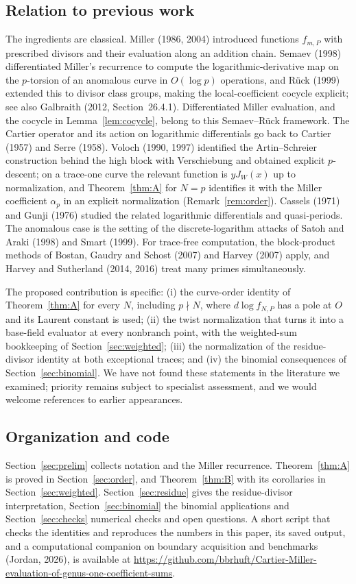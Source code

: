 \documentclass[11pt,a4paper]{article}
\numberwithin{equation}{section}
\theoremstyle{plain}
\theoremstyle{definition}
\begin{document}
\subsection{Relation to previous work}
The ingredients are classical. Miller (1986, 2004) introduced functions $f_{m,P}$ with prescribed divisors and their evaluation along an addition chain. Semaev (1998) differentiated Miller's recurrence to compute the logarithmic-derivative map on the $p$-torsion of an anomalous curve in $O(\log p)$ operations, and R\"uck (1999) extended this to divisor class groups, making the local-coefficient cocycle explicit; see also Galbraith (2012, Section~26.4.1). Differentiated Miller evaluation, and the cocycle in Lemma~\ref{lem:cocycle}, belong to this Semaev--R\"uck framework. The Cartier operator and its action on logarithmic differentials go back to Cartier (1957) and Serre (1958). Voloch (1990, 1997) identified the Artin--Schreier construction behind the high block with Verschiebung and obtained explicit $p$-descent; on a trace-one curve the relevant function is $yJ_W(x)$ up to normalization, and Theorem~\ref{thm:A} for $N=p$ identifies it with the Miller coefficient $\alpha_p$ in an explicit normalization (Remark~\ref{rem:order}). Cassels (1971) and Gunji (1976) studied the related logarithmic differentials and quasi-periods. The anomalous case is the setting of the discrete-logarithm attacks of Satoh and Araki (1998) and Smart (1999). For trace-free computation, the block-product methods of Bostan, Gaudry and Schost (2007) and Harvey (2007) apply, and Harvey and Sutherland (2014, 2016) treat many primes simultaneously.

The proposed contribution is specific: (i) the curve-order identity of Theorem~\ref{thm:A} for every $N$, including $p\nmid N$, where $d\log f_{N,P}$ has a pole at $O$ and its Laurent constant is used; (ii) the twist normalization that turns it into a base-field evaluator at every nonbranch point, with the weighted-sum bookkeeping of Section~\ref{sec:weighted}; (iii) the normalization of the residue-divisor identity at both exceptional traces; and (iv) the binomial consequences of Section~\ref{sec:binomial}. We have not found these statements in the literature we examined; priority remains subject to specialist assessment, and we would welcome references to earlier appearances.

\subsection{Organization and code}
Section~\ref{sec:prelim} collects notation and the Miller recurrence. Theorem~\ref{thm:A} is proved in Section~\ref{sec:order}, and Theorem~\ref{thm:B} with its corollaries in Section~\ref{sec:weighted}. Section~\ref{sec:residue} gives the residue-divisor interpretation, Section~\ref{sec:binomial} the binomial applications and Section~\ref{sec:checks} numerical checks and open questions. A short script that checks the identities and reproduces the numbers in this paper, its saved output, and a computational companion on boundary acquisition and benchmarks (Jordan, 2026), is available at \url{https://github.com/bbrhuft/Cartier-Miller-evaluation-of-genus-one-coefficient-sums}.
\end{document}
